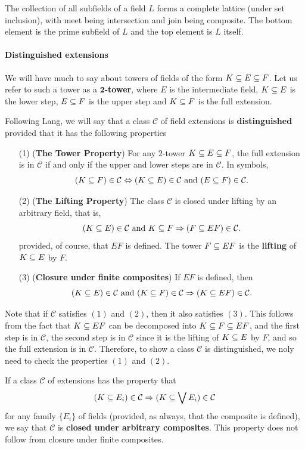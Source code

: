 The collection of all subfields of a field $L$ forms a complete lattice (under set inclusion), with meet being intersection and join being composite. The bottom element is the prime subfield of $L$ and the top element is $L$ itself.\par
\paragraph{Distinguished extensions}
We will have much to say about towers of fields of the form $K\subseteq E\subseteq F$. Let us refer to such a tower as a \textbf{$\bm{2}$-tower}, where $E$ is the intermediate field, $K\subseteq E$ is the lower step, $E\subseteq F$ is the upper step and $K\subseteq F$ is the full extension.\par
Following Lang, we will say that a class $\mathcal{C}$ of field extensions is \textbf{distinguished} provided that it has the following properties
\begin{itemize}
\item[(1)] (\textbf{The Tower Property}) For any $2$-tower $K\subseteq E\subseteq F$, the full extension is in $\mathcal{C}$ if and only if the upper and lower steps are in $\mathcal{C}$. In symbols,
\[(K\subseteq F)\in\mathcal{C}\Leftrightarrow (K\subseteq E)\in\mathcal{C}\text{ and }(E\subseteq F)\in\mathcal{C}.\] 
\item[(2)] (\textbf{The Lifting Property}) The class $\mathcal{C}$ is closed under lifting by an arbitrary field, that is,
\[(K\subseteq E)\in\mathcal{C}\text{ and }K\subseteq F\Rightarrow(F\subseteq EF)\in\mathcal{C}.\] 
provided, of course, that $EF$ is defined. The tower $F\subseteq EF$ is the \textbf{lifting} of $K\subseteq E$ by $F$.
\item[(3)] (\textbf{Closure under finite composites}) If $EF$ is defined, then
\[(K\subseteq E)\in\mathcal{C}\text{ and }(K\subseteq F)\in\mathcal{C}\Rightarrow(K\subseteq EF)\in\mathcal{C}.\] 
\end{itemize}
Note that if $\mathcal{C}$ satisfies $(1)$ and $(2)$, then it also satisfies $(3)$. This follows from the fact that $K\subseteq EF$ can be decomposed into $K\subseteq F\subseteq EF$, and the first step is in $\mathcal{C}$, the second step is in $\mathcal{C}$ since it is the lifting of $K\subseteq E$
by $F$, and so the full extension is in $\mathcal{C}$. Therefore, to show a class $\mathcal{C}$ is distinguished, we noly need to check the properties $(1)$ and $(2)$.\par
If a class $\mathcal{C}$ of extensions has the property that
\[(K\subseteq E_i)\in\mathcal{C}\Rightarrow(K\subseteq\bigvee E_i)\in\mathcal{C}\]
for any family $\{E_i\}$ of fields (provided, as always, that the composite is defined), we say that $\mathcal{C}$ is \textbf{closed under arbitrary composites}. This property does not follow from closure under finite composites.\par
